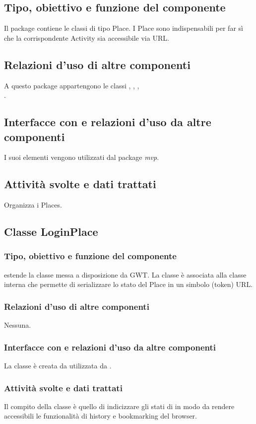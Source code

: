 \subsection*{Tipo, obiettivo e funzione del componente}
Il package contiene le classi di tipo Place. I Place sono indispensabili
per far s\`i che la corrispondente Activity sia accessibile via URL.
\subsection*{Relazioni d'uso di altre componenti}
A questo package appartengono le classi , ,
, \\.
\subsection*{Interfacce con e relazioni d'uso da altre componenti}
 I suoi elementi vengono utilizzati dal package \emph{mvp}.
\subsection*{Attivit\`a svolte e dati trattati}
Organizza i Places.

\subsection{Classe LoginPlace}
\subsubsection*{Tipo, obiettivo e funzione del componente}
 estende la classe  messa a disposizione da GWT. La
classe \`e associata alla classe interna  che permette di
serializzare lo stato del Place in un simbolo (token) URL.
\subsubsection*{Relazioni d'uso di altre componenti}
Nessuna.
\subsubsection*{Interfacce con e relazioni d'uso da altre componenti}
La classe \`e creata da  utilizzata da .
\subsubsection*{Attivit\`a svolte e dati trattati}
Il compito della classe \`e quello di indicizzare gli stati di
 in modo da rendere accessibili le funzionalit\`a di history e
bookmarking del browser.

